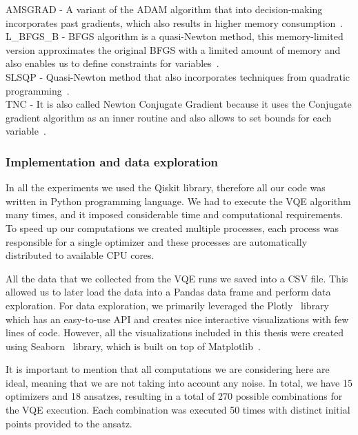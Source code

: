 AMSGRAD - A variant of the ADAM algorithm that into decision-making incorporates past gradients, which also results in higher memory consumption~\cite{amsgrad}.\\
L\_BFGS\_B - BFGS algorithm is a quasi-Newton method, this memory-limited version approximates the original BFGS with a limited amount of memory and also enables us to define constraints for variables~\cite{lbfgsb}.\\
SLSQP - Quasi-Newton method that also incorporates techniques from quadratic programming~\cite{slsqp}.\\
TNC - It is also called Newton Conjugate Gradient because it uses the Conjugate gradient algorithm as an inner routine and also allows to set bounds for each variable~\cite{tnc}.


\subsubsection{Implementation and data exploration}
In all the experiments we used the Qiskit library, therefore all our code was written in Python programming language. We had to execute the VQE algorithm many times, and it imposed considerable time and computational requirements. To speed up our computations we created multiple processes, each process was responsible for a single optimizer and these processes are automatically distributed to available CPU cores.

All the data that we collected from the VQE runs we saved into a CSV file. This allowed us to later load the data into a Pandas data frame and perform data exploration. For data exploration, we primarily leveraged the Plotly~\cite{plotly} library which has an easy-to-use API and creates nice interactive visualizations with few lines of code. However, all the visualizations included in this thesis were created using Seaborn~\cite{seaborn} library, which is built on top of Matplotlib~\cite{seaborn}.

It is important to mention that all computations we are considering here are ideal, meaning that we are not taking into account any noise. In total, we have 15 optimizers and 18 ansatzes, resulting in a total of 270 possible combinations for the VQE execution. Each combination was executed 50 times with distinct initial points provided to the ansatz.

